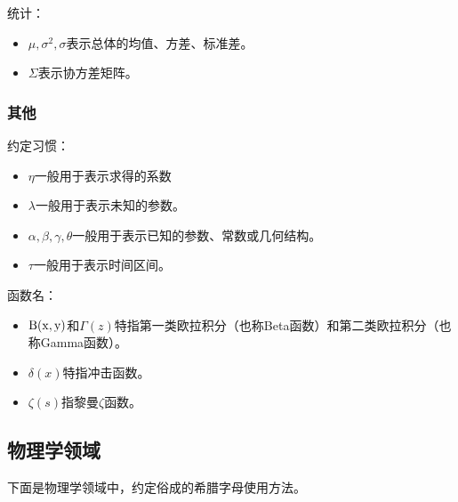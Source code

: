 统计：
\begin{itemize}
\item $\mu,\sigma^2,\sigma$表示总体的均值、方差、标准差。
\item $\Sigma$表示协方差矩阵。
\end{itemize}


\subsubsection{其他}

约定习惯：

\begin{itemize}
\item $\eta$一般用于表示求得的系数
\item $\lambda$一般用于表示未知的参数。
\item $\alpha,\beta,\gamma,\theta$一般用于表示已知的参数、常数或几何结构。
\item $\tau$一般用于表示时间区间。
\end{itemize}

函数名：

\begin{itemize}
\item ${\rm B(x,y)}$和${\Gamma (z)}$特指第一类欧拉积分（也称Beta函数）和第二类欧拉积分（也称Gamma函数）。
\item $\delta(x)$特指冲击函数。
\item $\zeta(s)$指黎曼$\zeta$函数。
\end{itemize}

\subsection{物理学领域}

下面是物理学领域中，约定俗成的希腊字母使用方法。
